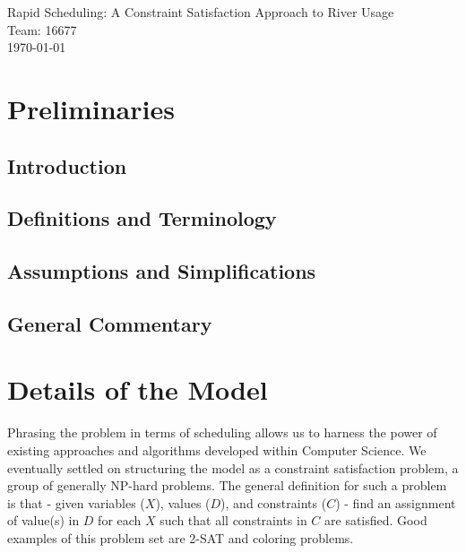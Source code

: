 \documentclass[11pt]{article} %
\begin{document}
\begin{titlepage}
    \vspace*{\fill}
    \begin{center}
      \Huge{Rapid Scheduling: A Constraint Satisfaction
        Approach to River Usage}\\[0.5cm]
      \Large{Team: 16677}\\[0.4cm]
      \today
    \end{center}
    \vspace*{\fill}
  \end{titlepage}
\newpage
\vspace*{\fill}
\tableofcontents
\vspace*{\fill}
\newpage

\section{Preliminaries}
\label{sec:prelims}

\subsection{Introduction}
\label{sec:intro}

\subsection{Definitions and Terminology}
\label{sec:defs}

\subsection{Assumptions and Simplifications}
\label{sec:assumptions}


\subsection{General Commentary}
\label{sec:prelim-comments}


\section{Details of the Model}
\label{sec:model-details}
Phrasing the problem in terms of scheduling allows us to harness the power
of existing approaches and algorithms developed within Computer Science.
We eventually settled on structuring the model as a constraint satisfaction
problem, a group of generally NP-hard problems.  The general definition
for such a problem is that - given variables ($X$), values ($D$),
and constraints ($C$) - find an assignment of value(s) in $D$
for each $X$ such that all constraints in $C$ are satisfied.
Good examples of this problem set are 2-SAT and coloring problems.
\end{document}
